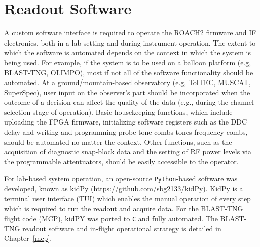 \section{Readout Software}\label{software}

A custom software interface is required to operate the ROACH2 firmware and IF electronics, both in a lab setting and during instrument operation. The extent to which the software is automated depends on the context in which the system is being used. For example, if the system is to be used on a balloon platform (e.g, BLAST-TNG, OLIMPO), most if not all of the software functionality should be automated. At a ground/mountain-based observatory (e.g, TolTEC, MUSCAT, SuperSpec), user input on the observer's part should be incorporated when the outcome of a decision can affect the quality of the data (e.g., during the channel selection stage of operation). Basic housekeeping functions, which include uploading the FPGA firmware, initializing software registers such as the DDC delay and writing and programming probe tone combs tones frequency combs, should be automated no matter the context. Other functions, such as the acquisition of diagnostic snap-block data and the setting of RF power levels via the programmable attentuators, should be easily accessible to the operator.

For lab-based system operation, an open-source \texttt{Python}-based software was developed, known as kidPy (\url{https://github.com/sbg2133/kidPy}). KidPy is a terminal user interface (TUI) which enables the manual operation of every step which is required to run the readout and acquire data. For the BLAST-TNG flight code (MCP), kidPY was ported to \texttt{C} and fully automated. The BLAST-TNG readout software and in-flight operational strategy is detailed in Chapter~\ref{mcp}.
